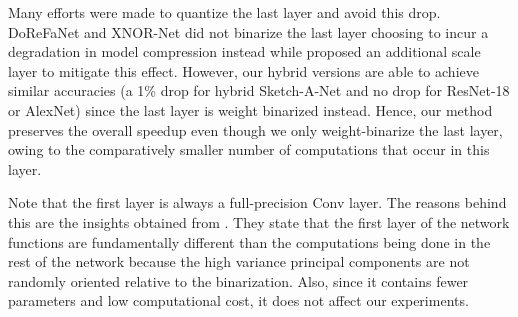 \documentclass[10pt,twocolumn,letterpaper]{article}
\begin{document}
\begin{table}[t]
\caption{Effects of last layer weight-binarization on TU-Berlin dataset, for Sketch-A-Net and ResNet-1. Observe that our hybrid models do not face drastic accuracy drop when the last layer is weight-binarized.}
\label{table:otherresults}
\vspace{-0.3cm}
\end{table}

Many efforts were made to quantize the last layer and avoid this drop. DoReFaNet and XNOR-Net did not binarize the last layer choosing to incur a degradation in model compression instead while \cite{tang2017train} proposed an additional scale layer to mitigate this effect. However, our hybrid versions are able to achieve similar accuracies (a 1\% drop for hybrid Sketch-A-Net and no drop for ResNet-18 or AlexNet) since the last layer is weight binarized instead. Hence, our method preserves the overall speedup even though we only weight-binarize the last layer, owing to the comparatively smaller number of computations that occur in this layer.

Note that the first layer is always a full-precision Conv layer. The reasons behind this are the insights obtained from \cite{anderson2017high}. They state that the first layer of the network functions are fundamentally different than the computations being
done in the rest of the network because the high variance principal components are not
randomly oriented relative to the binarization. Also, since it contains fewer parameters and low computational cost, it does not affect our experiments.
\end{document}
